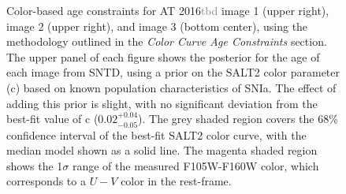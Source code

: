 \documentclass[12pt,dvipsnames]{article}
\def\SNABC{AT 2016{\textcolor{Gray}{tbd}}\xspace}
\begin{document}
\begin{figure}
    \caption{Color-based age constraints for \SNABC image 1 (upper right), image 2 (upper right), and image 3 (bottom center), using the methodology outlined in the \textit{Color Curve Age Constraints} section. The upper panel of each figure shows the posterior for the age of each image from SNTD, using a prior on the SALT2 color parameter (c) based on known population characteristics of SNIa. The effect of adding this prior is slight, with no significant deviation from the best-fit value of c ($0.02^{+0.04}_{-0.05}$). The grey shaded region covers the 68\% confidence interval of the best-fit SALT2 color curve, with the median model shown as a solid line. The magenta shaded region shows the 1$\sigma$ range of the measured F105W-F160W color, which corresponds to a $U-V$ color in the rest-frame.}
    \label{fig:colorcurves}
\end{figure}
\end{document}
